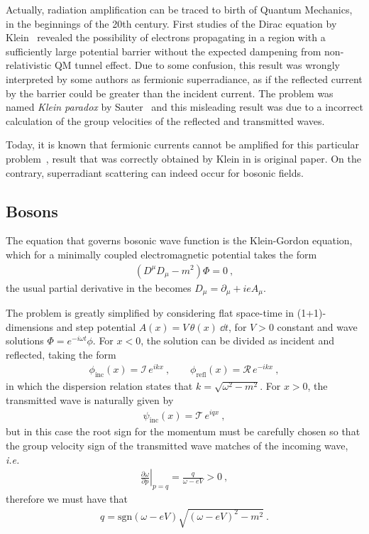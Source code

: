 Actually, radiation amplification can be traced to birth of Quantum Mechanics, in the beginnings of the 20th century. 
First studies of the Dirac equation by Klein~\cite{Klein1929} revealed the possibility of electrons propagating in a region with a sufficiently large potential barrier without the expected dampening from non-relativistic QM tunnel effect.
Due to some confusion, this result was wrongly interpreted by some authors as fermionic superradiance, as if the reflected current by the barrier could be greater than the incident current. 
The problem was named \emph{Klein paradox} by Sauter~\cite{Sauter1931} and this misleading result was due to a incorrect calculation of the group velocities of the reflected and transmitted waves. 

Today, it is known that fermionic currents cannot be amplified for this particular problem~\cite{Manogue1988}, result that was correctly obtained by Klein in is original paper. 
On the contrary, superradiant scattering can indeed occur for bosonic fields.

\subsection{Bosons}

The equation that governs bosonic wave function is the Klein-Gordon equation, which for a minimally coupled electromagnetic potential takes the form
\begin{align}
    (D^\mu D_\mu - m^2) \Phi = 0 ~,
\end{align}
the usual partial derivative in the becomes $D_\mu = \partial_\mu + i e A_\mu$. 

The problem is greatly simplified by considering flat space-time in (1+1)-dimensions and step potential $A(x) = V\,\theta(x) ~\dd t$, for $V>0$ constant and wave solutions $\Phi= e^{-i \omega t} \phi$.
For $x<0$, the solution can be divided as incident and reflected, taking the form
\begin{align}
    \phi_\mathrm{inc}(x) = \mathcal{I}\, e^{i k x}  ~, \qquad
    \phi_\mathrm{refl}(x) = \mathcal{R}\, e^{- i k x} ~,
\end{align}
in which the dispersion relation states that $k=\sqrt{\omega^2-m^2}$. For $x>0$, the transmitted wave is naturally given by 
\begin{align}
    \psi_\mathrm{inc}(x) = \mathcal{T}\, e^{i q x}  ~,
\end{align}
but in this case the root sign for the momentum must be carefully chosen so that the group velocity sign of the transmitted wave matches of the incoming wave, \textit{i.e.}
\begin{align}
    \left.\frac{\partial \omega}{\partial p}\right|_{p=q} = \frac{q}{\omega - e V} > 0 ~,
\end{align}
therefore we must have that
\begin{align}
    q = \mathrm{sgn}(\omega - e V) \sqrt{ (\omega - e V)^2 - m^2 } ~.
\end{align}

